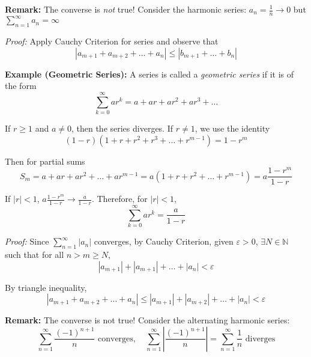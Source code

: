 \documentclass[12pt]{report}
\newcommand{\N}{\mathbb{N}}
\newcommand{\abs}[1]{\left\vert #1 \right\vert}
\newcommand{\ep}{\varepsilon}
\newenvironment*{tbox}[2][gray]{
    \begin{tcolorbox}[
        parbox=false,
        colback=#1!5!white,
        colframe=#1!75!black,
        breakable,
        title={#2}
    ]}
    {\end{tcolorbox}}
\begin{document}
    \textbf{Remark:} The converse is \emph{not} true! Consider the harmonic series: $a_n = \frac{1}{n} \to 0$ but $\sum_{n=1}^{\infty} a_n = \infty$ 

    \begin{tbox}{\textbf{Theorem (Comparison Test):} Assume $(a_k)$ and $(b_k)$ are sequences satisfying $0 \leq a_k \leq b_k$ for all $k \in \N$. Then 
        \begin{enumerate}
            \item If $\sum_{k=1}^{\infty} b_k$ converges, then $\sum_{k=1}^{\infty} a_k$ converges. 
            \item If $\sum_{k=1}^{\infty} a_k$ diverges, then $\sum_{k=1}^{\infty} b_k$ diverges.
        \end{enumerate}    
    }
        \emph{Proof:} Apply Cauchy Criterion for series and observe that 
        \[\abs{a_{m+1} + a_{m+2} + \dots + a_n} \leq \abs{b_{m+1} + \dots + b_n}\]
    \end{tbox}

    \textbf{Example (Geometric Series):} A series is called a \emph{geometric series} if it is of the form
    \[\sum_{k=0}^{\infty} ar^k = a + ar + ar^2 + ar^3 + \dots\] 

    If $r \geq 1$ and $a \neq 0$, then the series diverges. If $r \neq 1$, we use the identity 
    \[(1 - r)(1 + r + r^2 + r^3 + \dots + r^{m-1}) = 1 - r^m\]

    Then for partial sums  
    \[S_m = a + ar + ar^2 + \dots + ar^{m-1} = a(1 + r + r^2 + \dots + r^{m-1}) = a\frac{1 - r^m}{1 - r}\]

    If $\abs{r} < 1$, $a \frac{1 - r^m}{1 - r} \to \frac{a}{1 - r}$. Therefore, for $\abs{r} < 1$, 
    \[\sum_{k=0}^{\infty} ar^k = \frac{a}{1-r}\]

    \begin{tbox}{\textbf{Theorem (Absolute Convergence Test):} If the series $\sum_{n=1}^{\infty} \abs{a_n}$ converges, then $\sum_{n=1}^{\infty} a_n$ converges.}
        \emph{Proof:} Since $\sum_{n=1}^{\infty} \abs{a_n}$ converges, by Cauchy Criterion, given $\ep > 0$, $\exists N \in \N$ such that for all $n > m \geq N$,
        \[\abs{a_{m+1}} + \abs{a_{m+1}} + \dots + \abs{a_n} < \ep\]

        By triangle inequality, 
        \[\abs{a_{m+1} + a_{m+2} + \dots + a_n} \leq \abs{a_{m+1}} + \abs{a_{m+2}} + \dots + \abs{a_n} < \ep\]
    \end{tbox}

    \textbf{Remark:} The converse is not true! Consider the alternating harmonic series: 
    \[\sum_{n=1}^{\infty} \frac{(-1)^{n+1}}{n} \text{ converges}, \quad \sum_{n=1}^{\infty} \abs{\frac{(-1)^{n+1}}{n}} = \sum_{n=1}^{\infty} \frac{1}{n} \text{ diverges}\]
\end{document}
